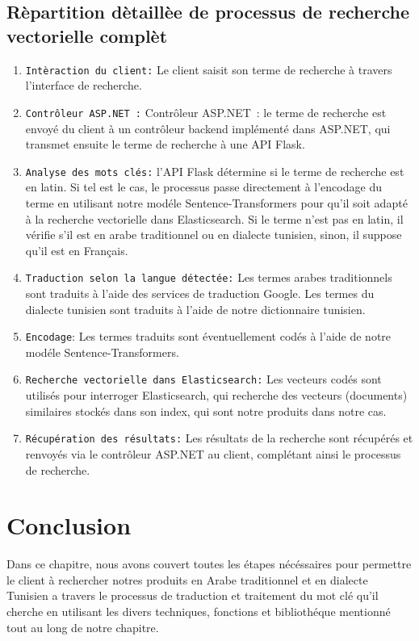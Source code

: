 \subsection{Rèpartition dètaillèe de processus de recherche vectorielle complèt}
\begin{enumerate}
	\item \texttt{Intèraction du client:} Le client saisit son terme de recherche à travers l'interface de recherche.
	\item \texttt{Contrôleur ASP.NET :} Contrôleur ASP.NET : le terme de recherche est envoyé du client à un contrôleur backend implémenté dans ASP.NET, qui transmet ensuite le terme de recherche à une API Flask.
	\item \texttt{Analyse des mots clés:} l'API Flask détermine si le terme de recherche est en latin. Si tel est le cas, le processus passe directement à l'encodage du terme en utilisant notre modéle Sentence-Transformers pour qu'il soit adapté à la recherche vectorielle dans Elasticsearch. Si le terme n'est pas en latin, il vérifie s'il est en arabe traditionnel ou en dialecte tunisien, sinon, il suppose qu'il est en Français.
	\item \texttt{Traduction selon la langue détectée:} Les termes arabes traditionnels sont traduits à l'aide des services de traduction Google. Les termes du dialecte tunisien sont traduits à l'aide de notre dictionnaire tunisien.
	\item \texttt{Encodage}: Les termes traduits sont éventuellement codés à l'aide de notre modéle Sentence-Transformers.
	\item \texttt{Recherche vectorielle dans Elasticsearch:} Les vecteurs codés sont utilisés pour interroger Elasticsearch, qui recherche des vecteurs (documents) similaires stockés dans son index, qui sont notre produits dans notre cas.
	\item \texttt{Récupération des résultats:} Les résultats de la recherche sont récupérés et renvoyés via le contrôleur ASP.NET au client, complétant ainsi le processus de recherche.
\end{enumerate}

\section{Conclusion}
\noindent
Dans ce chapitre, nous avons couvert toutes les étapes nécéssaires pour permettre le client à rechercher notres produits en Arabe traditionnel et en dialecte Tunisien a travers le processus de traduction et traitement du mot clé qu'il cherche en utilisant les divers techniques, fonctions et bibliothéque mentionné tout au long de notre chapitre.